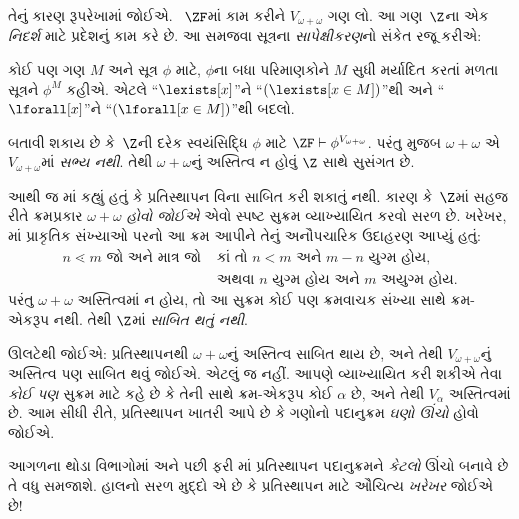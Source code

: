 તેનું કારણ રૂપરેખામાં જોઈએ. ~$\ZF$માં કામ કરીને
$V_{\omega+\omega}$ ગણ લો. આ ગણ~$\Z$ના એક \emph{નિદર્શ}
માટે પ્રદેશનું કામ કરે છે. આ સમજવા સૂત્રના
\emph{સાપેક્ષીકરણ}નો સંકેત રજૂ કરીએ:
\begin{defn}
	કોઈ પણ ગણ $M$ અને સૂત્ર $\phi$ માટે, $\phi$ના બધા
	પરિમાણકોને $M$ સુધી મર્યાદિત કરતાં મળતા સૂત્રને $\phi^M$
	કહીએ. એટલે ``$\lexists[x]$''ને ``$(\lexists[x \in M])$''થી
	અને ``$\lforall[x]$''ને ``$(\lforall[x \in M])$''થી બદલો.
\end{defn}\noindent
બતાવી શકાય છે કે~$\Z$ની દરેક સ્વયંસિદ્ધિ $\phi$ માટે
$\ZF \vdash
\phi^{V_{\omega+\omega}}$. પરંતુ
 મુજબ $\omega+\omega$
એ $V_{\omega+\omega}$માં \emph{સભ્ય નથી}. તેથી
$\omega+\omega$નું અસ્તિત્વ ન હોવું $\Z$ સાથે સુસંગત છે.

આથી જ માં કહ્યું હતું કે
પ્રતિસ્થાપન વિના સાબિત કરી શકાતું નથી. કારણ કે~$\Z$માં
સહજ રીતે ક્રમપ્રકાર $\omega+\omega$ \emph{હોવો જોઈએ} એવો
સ્પષ્ટ સુક્રમ વ્યાખ્યાયિત કરવો સરળ છે. ખરેખર,
માં પ્રાકૃતિક સંખ્યાઓ પરનો આ
ક્રમ આપીને તેનું અનૌપચારિક ઉદાહરણ આપ્યું હતું:
\begin{align*}
	n \lessdot m \text{ જો અને માત્ર જો }&\text{કાં તો }n < m\text{ અને }m-n\text{ યુગ્મ હોય,}\\
	& \text{અથવા $n$ યુગ્મ હોય અને $m$ અયુગ્મ હોય.}
\end{align*}
પરંતુ $\omega+\omega$ અસ્તિત્વમાં ન હોય, તો આ સુક્રમ કોઈ
પણ ક્રમવાચક સંખ્યા સાથે ક્રમ-એકરૂપ નથી. તેથી $\Z$માં
\emph{સાબિત થતું નથી}.

ઊલટેથી જોઈએ: પ્રતિસ્થાપનથી $\omega+\omega$નું અસ્તિત્વ
સાબિત થાય છે, અને તેથી $V_{\omega+\omega}$નું અસ્તિત્વ પણ
સાબિત થવું જોઈએ. એટલું જ નહીં. આપણે વ્યાખ્યાયિત કરી શકીએ
તેવા \emph{કોઈ પણ} સુક્રમ માટે
 કહે છે કે
તેની સાથે ક્રમ-એકરૂપ કોઈ $\alpha$ છે, અને તેથી $V_\alpha$
અસ્તિત્વમાં છે. આમ સીધી રીતે, પ્રતિસ્થાપન ખાતરી આપે છે કે
ગણોનો પદાનુક્રમ \emph{ઘણો ઊંચો} હોવો જોઈએ.

આગળના થોડા વિભાગોમાં અને પછી ફરી
માં પ્રતિસ્થાપન પદાનુક્રમને
\emph{કેટલો} ઊંચો બનાવે છે તે વધુ સમજાશે. હાલનો સરળ મુદ્દો
એ છે કે પ્રતિસ્થાપન માટે ઔચિત્ય \emph{ખરેખર} જોઈએ છે!
\endgroup

\begingroup
\makeatletter{}\makeatother

\label{guunit:OLP-0568}


